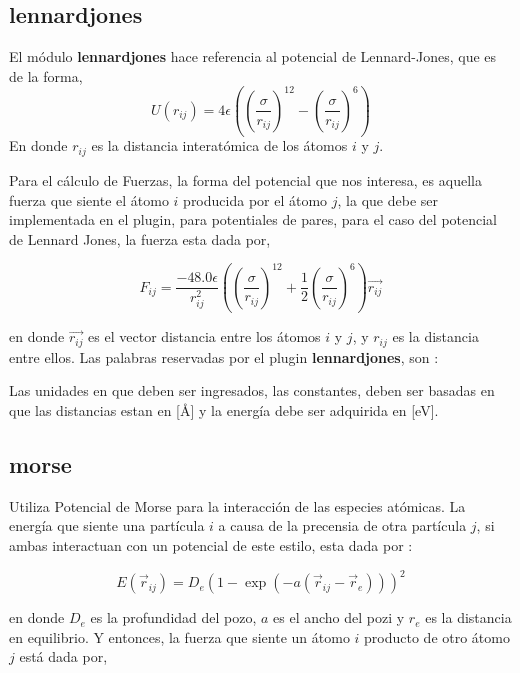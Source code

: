 \subsection{lennardjones}
El m\'odulo \textbf{lennardjones} hace referencia al potencial de Lennard-Jones, que es de la forma,
$$U(r_{ij}) = 4\epsilon\left(\left(\frac{\sigma}{r_{ij}}\right)^{12}-\left(\frac{\sigma}{r_{ij}}\right)^6\right)$$
En donde $r_{ij}$ es la distancia interat\'omica de los \'atomos $i$ y $j$. 

Para el c\'alculo de Fuerzas, la forma del potencial que nos interesa, es aquella fuerza que siente el \'atomo $i$ producida por el \'atomo $j$, la que debe ser implementada en el plugin, para potentiales de pares, para el caso del potencial de Lennard Jones, la fuerza esta dada por,

$$F_{ij} = \frac{-48.0\epsilon}{r_{ij}^2}\left( \left(\frac{\sigma}{r_{ij}}\right)^{12} + \frac{1}{2}\left(\frac{\sigma}{r_{ij}}\right)^6 \right) \vec{r_{ij}}$$

en donde $\vec{r_{ij}}$ es el vector distancia entre los \'atomos $i$ y $j$, y $r_{ij}$ es la distancia entre ellos. 
Las palabras reservadas por el plugin \textbf{lennardjones}, son :


Las unidades en que deben ser ingresados, las constantes, deben ser basadas en que las distancias estan en [\AA] y la energ\'ia debe ser adquirida en [eV].

\subsection{morse}
Utiliza Potencial de Morse para la interacci\'on de las especies at\'omicas. La energ\'ia que siente una part\'icula $i$ a causa de la precensia de otra part\'icula $j$, si ambas interactuan con un potencial de este estilo, esta dada por :

$$E(\vec{r}_{ij}) = D_e\left(1-\exp(-a(\vec{r}_{ij}-\vec{r}_e))\right)^2$$

en donde $D_e$ es la profundidad del pozo, $a$ es el ancho del pozi y $r_e$ es la distancia en equilibrio. Y entonces, la fuerza que siente un \'atomo $i$ producto de otro \'atomo $j$ est\'a dada por,

